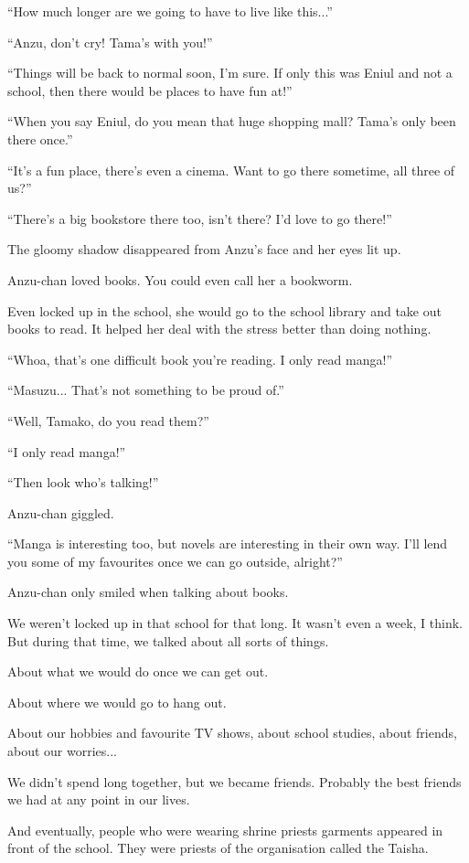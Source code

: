 ``How much longer are we going to have to live like this...''

``Anzu, don't cry! Tama's with you!''

``Things will be back to normal soon, I'm sure. If only this was Eniul and not a school, then there would be places to have fun at!''

``When you say Eniul, do you mean that huge shopping mall? Tama's only been there once.''

``It's a fun place, there's even a cinema. Want to go there sometime, all three of us?''

``There's a big bookstore there too, isn't there? I'd love to go there!''

The gloomy shadow disappeared from Anzu's face and her eyes lit up.

Anzu-chan loved books. You could even call her a bookworm.

Even locked up in the school, she would go to the school library and take out books to read. It helped her deal with the stress better than doing nothing.

``Whoa, that's one difficult book you're reading. I only read manga!''

``Masuzu... That's not something to be proud of.''

``Well, Tamako, do you read them?''

``I only read manga!''

``Then look who's talking!''

Anzu-chan giggled.

``Manga is interesting too, but novels are interesting in their own way. I'll lend you some of my favourites once we can go outside, alright?''

Anzu-chan only smiled when talking about books.

We weren't locked up in that school for that long. It wasn't even a week, I think. But during that time, we talked about all sorts of things.

About what we would do once we can get out.

About where we would go to hang out.

About our hobbies and favourite TV shows, about school studies, about friends, about our worries...

We didn't spend long together, but we became friends. Probably the best friends we had at any point in our lives.

And eventually, people who were wearing shrine priests garments appeared in front of the school. They were priests of the organisation called the Taisha.

